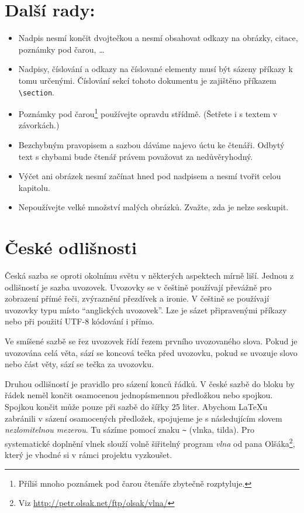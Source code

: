 \documentclass[a4paper,twocolumn]{article}[20-02-2022]
\begin{document}
\section{Další rady:}
\label{rady}
\begin{itemize}
    \item Nadpis nesmí končit dvojtečkou a nesmí obsahovat odkazy na obrázky, citace, poznámky pod čarou, \dots

    \item Nadpisy, číslování a odkazy na číslované elementy musí být sázeny příkazy k tomu určenými. Číslování sekcí tohoto dokumentu je zajištěno příkazem \verb|\section|.

    \item Poznámky pod čarou\footnote{Příliš mnoho poznámek pod čarou čtenáře zbytečně rozptyluje.} používejte opravdu střídmě. (Šetřete i s textem v závorkách.)

    \item Bezchybným pravopisem a sazbou dáváme najevo úctu ke čtenáři. Odbytý text s chybami bude čtenář právem považovat za nedůvěryhodný.

    \item Výčet ani obrázek nesmí začínat hned pod nadpisem a nesmí tvořit celou kapitolu.

    \item Nepoužívejte velké množství malých obrázků. Zvažte, zda je nelze seskupit.
\end{itemize}

\section{České odlišnosti}
Česká sazba se oproti okolnímu světu v některých aspektech mírně liší.
Jednou z odlišností je sazba uvozovek.
Uvozovky se v češtině používají převážně pro zobrazení přímé řeči, zvýraznění přezdívek a ironie.
V češtině se používají uvozovky typu  místo ``anglických uvozovek''.
Lze je sázet připravenými příkazy nebo při použití UTF-8 kódování i přímo.

Ve smíšené sazbě se řez uvozovek řídí řezem prvního uvozovaného slova.
Pokud je uvozována celá věta, sází se koncová tečka před uvozovku, pokud se uvozuje slovo nebo část věty, sází se tečka za uvozovku.

Druhou odlišností je pravidlo pro sázení konců řádků.
V české sazbě do bloku by řádek neměl končit osamocenou jednopísmennou předložkou nebo spojkou.
Spojkou  končit může pouze při sazbě do šířky 25 liter.
Abychom \LaTeX u zabránili v sázení osamocených předložek, spojujeme je s následujícím slovem \emph{nezlomitelnou mezerou}.
Tu sázíme pomocí znaku \texttt{\textasciitilde} (vlnka, tilda).
Pro systematické doplnění vlnek slouží volně šiřitelný program \emph{vlna} od pana Olšáka\footnote{Viz \url{http://petr.olsak.net/ftp/olsak/vlna/}}, který je vhodné si v rámci projektu vyzkoušet.
\end{document}
